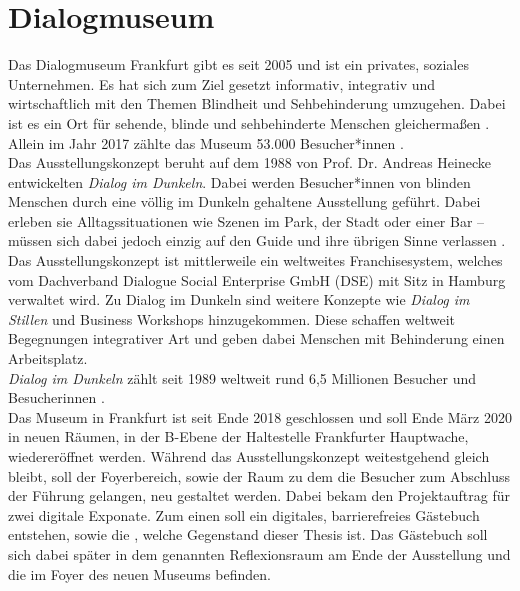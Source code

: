 \section{Dialogmuseum}
\label{sec:dialogmuseum}

Das Dialogmuseum Frankfurt gibt es seit 2005 und ist ein privates, soziales 
Unternehmen. Es hat sich zum Ziel gesetzt informativ, integrativ und wirtschaftlich mit 
den Themen Blindheit und Sehbehinderung umzugehen. Dabei ist es ein Ort für sehende, 
blinde und sehbehinderte Menschen gleichermaßen \cite{dialogmuseum}. Allein im Jahr 2017 zählte das Museum 53.000 
Besucher*innen \cite{besucher}.\\

Das Ausstellungskonzept beruht auf dem 1988 von Prof. Dr. Andreas Heinecke entwickelten
\emph{Dialog im Dunkeln}. Dabei werden Besucher*innen von blinden Menschen durch eine 
völlig im Dunkeln gehaltene Ausstellung geführt. Dabei erleben sie Alltagssituationen
wie Szenen im Park, der Stadt oder einer Bar -- müssen sich dabei jedoch einzig auf
den Guide und ihre übrigen Sinne verlassen \cite{dialogmuseum}.\\

Das Ausstellungskonzept ist mittlerweile ein weltweites Franchisesystem, welches vom 
Dachverband Dialogue Social Enterprise GmbH (DSE) \cite{dachverband} mit Sitz in Hamburg verwaltet wird.
Zu Dialog im Dunkeln sind weitere Konzepte wie \emph{Dialog im Stillen} und Business Workshops
hinzugekommen. Diese schaffen weltweit Begegnungen integrativer Art und geben dabei 
Menschen mit Behinderung einen Arbeitsplatz.\\
\emph{Dialog im Dunkeln} zählt seit 1989 weltweit rund 6,5 Millionen Besucher und Besucherinnen
\cite{weltweit}.\\

Das Museum in Frankfurt ist seit Ende 2018 geschlossen und soll Ende März 2020 in neuen Räumen, in der B-Ebene
der Haltestelle Frankfurter Hauptwache, wiedereröffnet werden. Während das Ausstellungskonzept
weitestgehend gleich bleibt, soll der Foyerbereich, sowie der Raum zu dem die Besucher zum Abschluss
der Führung gelangen, neu gestaltet werden. Dabei bekam \meso{} den Projektauftrag für zwei
digitale Exponate. Zum einen soll ein digitales, barrierefreies Gästebuch entstehen, sowie die
\shst{}, welche Gegenstand dieser Thesis ist. Das Gästebuch soll sich dabei später in dem 
genannten Reflexionsraum am Ende der Ausstellung und die \shst{} im Foyer des neuen Museums befinden.
